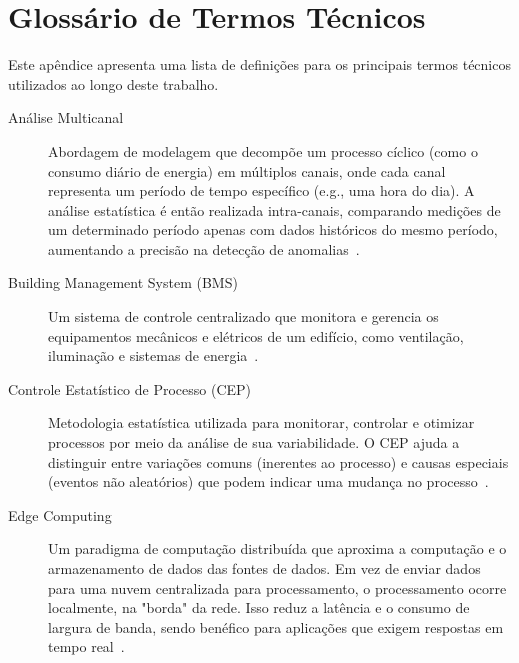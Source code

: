 \chapter{Glossário de Termos Técnicos}
\label{apendice:glossario}

Este apêndice apresenta uma lista de definições para os principais termos técnicos utilizados ao longo deste trabalho.

\begin{description}
    \item[Análise Multicanal] Abordagem de modelagem que decompõe um processo cíclico (como o consumo diário de energia) em múltiplos canais, onde cada canal representa um período de tempo específico (e.g., uma hora do dia). A análise estatística é então realizada intra-canais, comparando medições de um determinado período apenas com dados históricos do mesmo período, aumentando a precisão na detecção de anomalias~\cite{Braga2010TeseValidacao}.

    \item[Building Management System (BMS)] Um sistema de controle centralizado que monitora e gerencia os equipamentos mecânicos e elétricos de um edifício, como ventilação, iluminação e sistemas de energia~\cite{Lee2013BMS}.

    \item[Controle Estatístico de Processo (CEP)] Metodologia estatística utilizada para monitorar, controlar e otimizar processos por meio da análise de sua variabilidade. O CEP ajuda a distinguir entre variações comuns (inerentes ao processo) e causas especiais (eventos não aleatórios) que podem indicar uma mudança no processo~\cite{Braga2013SPCBuildingEnergy}.

    \item[Edge Computing] Um paradigma de computação distribuída que aproxima a computação e o armazenamento de dados das fontes de dados. Em vez de enviar dados para uma nuvem centralizada para processamento, o processamento ocorre localmente, na "borda" da rede. Isso reduz a latência e o consumo de largura de banda, sendo benéfico para aplicações que exigem respostas em tempo real~\cite{Shi2016Edge}.

\end{description}
